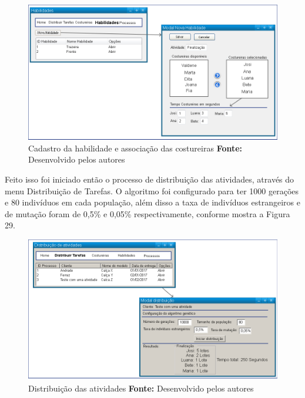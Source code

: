 \begin{figure}[h!]
	\centerline{\includegraphics[scale=0.4]{./imagens/test_case_1_habilidades.png}}
	\caption[Cadastro da habilidade e associação das costureiras]
	{Cadastro da habilidade e associação das costureiras \textbf{Fonte:} Desenvolvido pelos autores}
	\label{fig:exemplo1}
\end{figure}

\par Feito isso foi iniciado então o processo de distribuição das atividades, através do menu Distribuição de Tarefas.
O algoritmo foi configurado para ter 1000 gerações e 80 indivíduos em cada população, além disso a taxa de indivíduos
estrangeiros e de mutação foram de 0,5\% e 0,05\% respectivamente, conforme
mostra a Figura 29.

\begin{figure}[h!]
	\centerline{\includegraphics[scale=0.4]{./imagens/test_case1_distribuicao.png}}
	\caption[Distribuição das atividades]
	{Distribuição das atividades \textbf{Fonte:} Desenvolvido pelos autores}
	\label{fig:exemplo1}
\end{figure}

